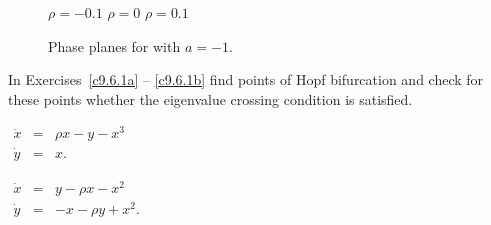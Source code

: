 \documentclass{ximera}
\begin{document}
\begin{figure}[htb]
           \centerline{%
           }
 	\vspace*{-0.2in}
	\hspace{0.3in} $\rho=-0.1$  \hspace{1.7in} $\rho=0$
		\hspace{1.8in} $\rho=0.1$ 
          \caption{Phase planes for \protect{} with $a=-1$.}
           \label{F:nonlinhopf}
\end{figure}



\EXER

\TEXER

\noindent In Exercises~\ref{c9.6.1a} -- \ref{c9.6.1b} find points of Hopf
bifurcation and check for these points whether the eigenvalue crossing
condition  is satisfied.
\begin{exercise} \label{c9.6.1a}
$\begin{array}{rcl}
\dot{x} & = & \rho x - y -x^3 \\
\dot{y} & = & x.
\end{array}$
\end{exercise}
\begin{exercise} \label{c9.6.1b}
$\begin{array}{rcl}
\dot{x} & = & y - \rho x - x^2   \\
\dot{y} & = & -x - \rho y + x^2.
\end{array}$
\end{exercise}
\end{document}
